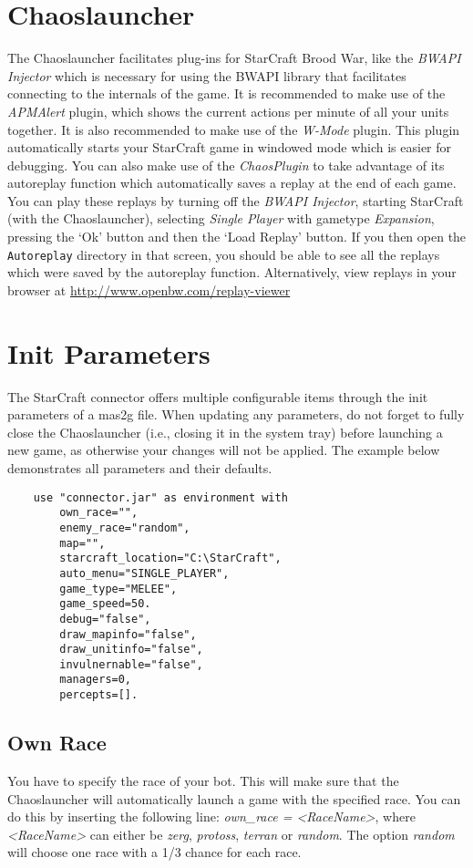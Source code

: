 \section{Chaoslauncher}
The Chaoslauncher facilitates plug-ins for StarCraft Brood War, like the \textit{BWAPI Injector} which is necessary for using the BWAPI library that facilitates connecting to the internals of the game. It is recommended to make use of the \textit{APMAlert} plugin, which shows the current actions per minute of all your units together. It is also recommended to make use of the \textit{W-Mode} plugin. This plugin automatically starts your StarCraft game in windowed mode which is easier for debugging. You can also make use of the \textit{ChaosPlugin} to take advantage of its autoreplay function which automatically saves a replay at the end of each game. You can play these replays by turning off the \textit{BWAPI Injector}, starting StarCraft (with the Chaoslauncher), selecting \textit{Single Player} with gametype \textit{Expansion}, pressing the `Ok' button and then the `Load Replay' button. If you then open the \texttt{Autoreplay} directory in that screen, you should be able to see all the replays which were saved by the autoreplay function. Alternatively, view replays in your browser at \url{http://www.openbw.com/replay-viewer}

\section{Init Parameters}
\label{mas2g}
The StarCraft connector offers multiple configurable items through the init parameters of a mas2g file. When updating any parameters, do not forget to fully close the Chaoslauncher (i.e., closing it in the system tray) before launching a new game, as otherwise your changes will not be applied. The example below demonstrates all parameters and their defaults.

\begin{verbatim}
    use "connector.jar" as environment with
        own_race="",
        enemy_race="random",
        map="",
        starcraft_location="C:\StarCraft",
        auto_menu="SINGLE_PLAYER",
        game_type="MELEE",
        game_speed=50.
        debug="false",
        draw_mapinfo="false",
        draw_unitinfo="false",
        invulnernable="false",
        managers=0,
        percepts=[].
\end{verbatim}

\subsection{Own Race}
\label{own race}
You have to specify the race of your bot. This will make sure that the Chaoslauncher will automatically launch a game with the specified race. You can do this by inserting the following line: \textit{own\_race = <RaceName>}, where \textit{<RaceName>} can either be \textit{zerg}, \textit{protoss}, \textit{terran} or \textit{random}. The option \textit{random} will choose one race with a 1/3 chance for each race.

